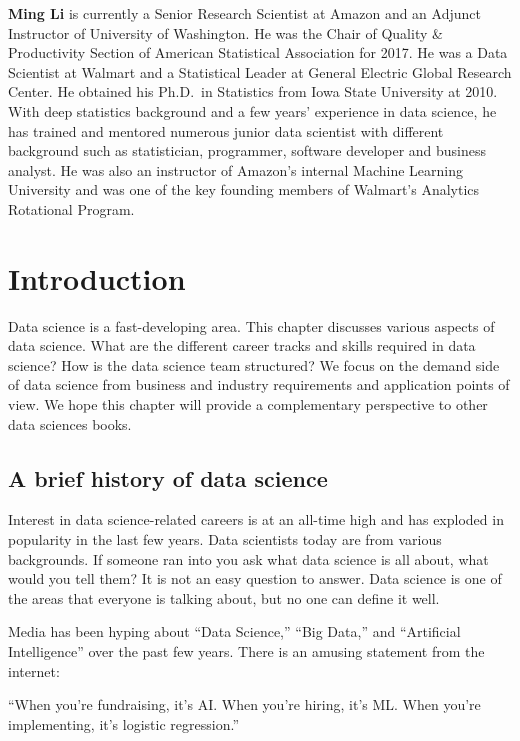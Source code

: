\documentclass[
  12pt,
]{krantz}
\renewenvironment{quote}{\begin{VF}}{\end{VF}}
\begin{document}
\textbf{Ming Li} is currently a Senior Research Scientist at Amazon and an Adjunct Instructor of University of Washington. He was the Chair of Quality \& Productivity Section of American Statistical Association for 2017. He was a Data Scientist at Walmart and a Statistical Leader at General Electric Global Research Center. He obtained his Ph.D.~in Statistics from Iowa State University at 2010. With deep statistics background and a few years' experience in data science, he has trained and mentored numerous junior data scientist with different background such as statistician, programmer, software developer and business analyst. He was also an instructor of Amazon's internal Machine Learning University and was one of the key founding members of Walmart's Analytics Rotational Program.

\mainmatter

\hypertarget{introduction}{%
\chapter{Introduction}\label{introduction}}

Data science is a fast-developing area. This chapter discusses various aspects of data science. What are the different career tracks and skills required in data science? How is the data science team structured? We focus on the demand side of data science from business and industry requirements and application points of view. We hope this chapter will provide a complementary perspective to other data sciences books.

\hypertarget{a-brief-history-of-data-science}{%
\section{A brief history of data science}\label{a-brief-history-of-data-science}}

Interest in data science-related careers is at an all-time high and has exploded in popularity in the last few years. Data scientists today are from various backgrounds. If someone ran into you ask what data science is all about, what would you tell them? It is not an easy question to answer. Data science is one of the areas that everyone is talking about, but no one can define it well.

Media has been hyping about ``Data Science,'' ``Big Data,'' and ``Artificial Intelligence'' over the past few years. There is an amusing statement from the internet:

\begin{quote}
``When you're fundraising, it's AI. When you're hiring, it's ML. When you're implementing, it's logistic regression.''
\end{quote}
\end{document}

